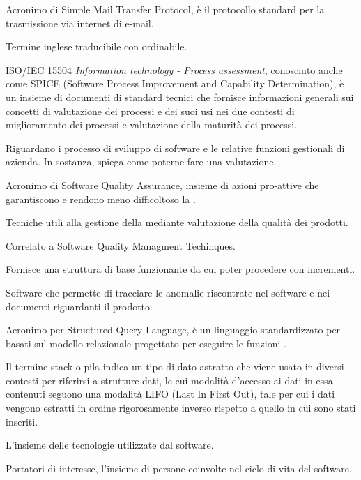 Acronimo di Simple Mail Transfer Protocol, è il protocollo standard per la trasmissione via internet di e-mail.

Termine inglese traducibile con ordinabile.

ISO/IEC 15504 \emph{Information technology - Process assessment}, conosciuto anche come SPICE (Software Process Improvement and Capability Determination), è un insieme di documenti di standard tecnici che fornisce informazioni generali sui concetti di valutazione dei processi e dei suoi usi nei due contesti di miglioramento dei processi e valutazione della maturità dei processi.

Riguardano i processo di sviluppo di software e le relative funzioni gestionali di azienda. In sostanza, spiega come poterne fare una valutazione.

Acronimo di Software Quality Assurance, insieme di azioni pro-attive che garantiscono  e rendono meno difficoltoso la .

Tecniche utili alla gestione della  mediante valutazione della qualità dei prodotti.

Correlato a Software Quality Managment Techinques.

Fornisce una struttura di base funzionante da cui poter procedere con incrementi.

Software che permette di tracciare le anomalie riscontrate nel software e nei documenti riguardanti il prodotto.

Acronimo per Structured Query Language, è un linguaggio standardizzato per  basati sul modello relazionale progettato per eseguire le funzioni .

Il termine stack o pila indica un tipo di dato astratto che viene usato in diversi contesti per riferirsi a strutture dati, le cui modalità d'accesso ai dati in essa contenuti seguono una modalità LIFO (Last In First Out), tale per cui i dati vengono estratti in ordine rigorosamente inverso rispetto a quello in cui sono stati inseriti.

L'insieme delle tecnologie utilizzate dal software.

Portatori di interesse, l'insieme di persone coinvolte nel ciclo di vita del software.

